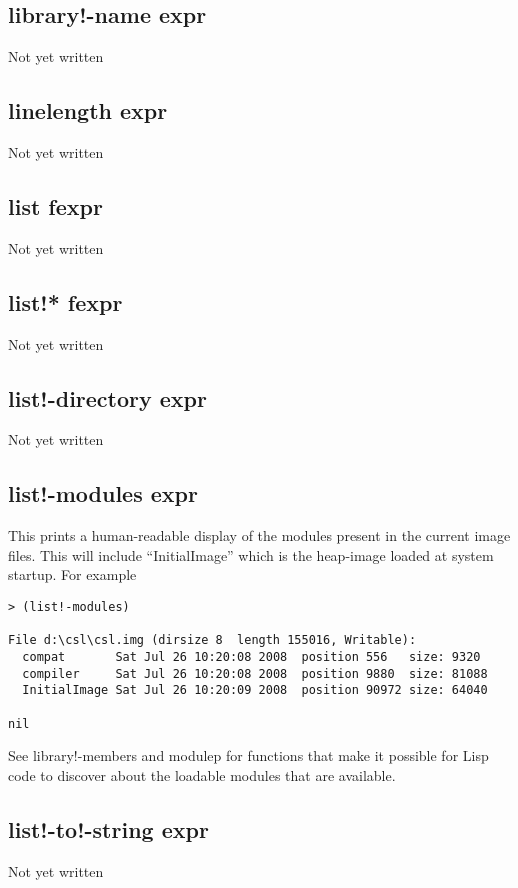 \documentclass[a4paper,11pt]{article}
\begin{document}
\subsection{\ttfamily library!-name expr}
Not yet written

\subsection{\ttfamily linelength expr}
Not yet written

\subsection{\ttfamily list fexpr}
Not yet written

\subsection{\ttfamily list!* fexpr}
Not yet written

\subsection{\ttfamily list!-directory expr}
Not yet written


\subsection{\ttfamily list!-modules expr}
This prints a human-readable display of the modules present in the current
image files. This will include ``InitialImage'' which is the heap-image
loaded at system startup. For example
\begin{verbatim}
> (list!-modules)

File d:\csl\csl.img (dirsize 8  length 155016, Writable):
  compat       Sat Jul 26 10:20:08 2008  position 556   size: 9320
  compiler     Sat Jul 26 10:20:08 2008  position 9880  size: 81088
  InitialImage Sat Jul 26 10:20:09 2008  position 90972 size: 64040

nil
\end{verbatim}

See {\ttfamily library!-members} and {\ttfamily modulep} for functions that
make it possible for Lisp code to discover about the loadable modules that are
available.
\subsection{\ttfamily list!-to!-string expr}
Not yet written
\end{document}
